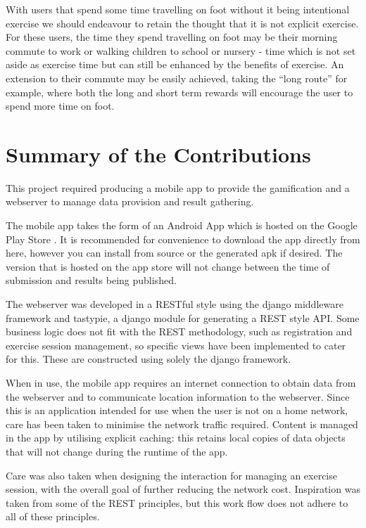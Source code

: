 With users that spend some time travelling on foot without it being
intentional exercise we should endeavour to retain the thought that it
is not explicit exercise. For these users, the time they spend
travelling on foot may be their morning commute to work or walking
children to school or nursery - time which is not set aside as
exercise time but can still be enhanced by the benefits of
exercise. An extension to their commute may be easily achieved, taking
the ``long route'' for example, where both the long and short term
rewards will encourage the user to spend more time on foot. 

\section{Summary of the Contributions}

This project required producing a mobile app to provide the
gamification and a webserver to manage data provision and result
gathering. 

The mobile app takes the form of an Android App which is hosted on the
Google Play Store \cite{app_store_link}. It is recommended for
convenience to download the app directly from here, however you can
install from source or the generated apk if desired. The version that
is hosted on the app store will not change between the time of
submission and results being published.

The webserver was developed in a RESTful style using the django
middleware framework\cite{django} and tastypie, a django module for
generating a REST style API\cite{tastypie}. Some business logic does
not fit with the REST methodology, such as registration and exercise
session management, so specific views have been implemented to cater
for this. These are constructed using solely the django framework.

When in use, the mobile app requires an internet connection to obtain
data from the webserver and to communicate location information to the
webserver. Since this is an application intended for use when the user
is not on a home network, care has been taken to minimise the network
traffic required. Content is managed in the app by utilising explicit
caching: this retains local copies of data objects that will not
change during the runtime of the app. 

Care was also taken when designing the interaction for managing an
exercise session, with the overall goal of further reducing the
network cost. Inspiration was taken from some of the REST principles,
but this work flow does not adhere to all of these principles. 

